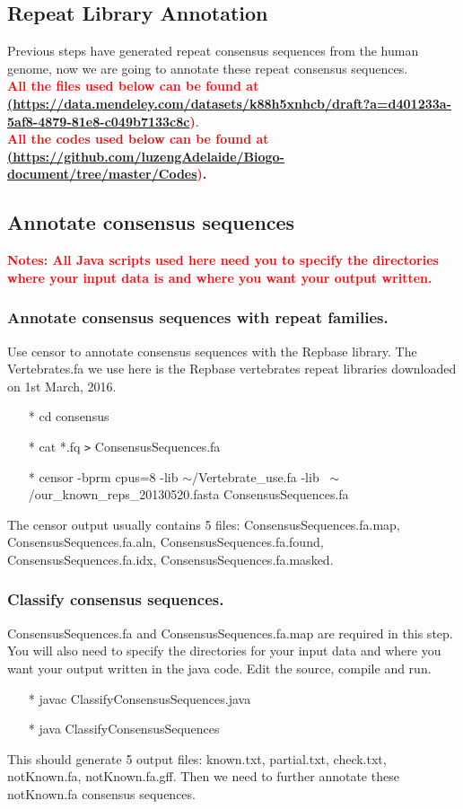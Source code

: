 \documentclass[12pt]{article}
\begin{document}
\subsection{Repeat Library Annotation}
Previous steps have generated repeat consensus sequences from the human genome, now we are going to annotate these repeat consensus sequences. \\
\textbf{\textcolor{red}{All the files used below can be found at \\
		\href{<url>}(\url{https://data.mendeley.com/datasets/k88h5xnhcb/draft?a=d401233a-5af8-4879-81e8-c049b7133c8c})}}. \\
\textbf{\textcolor{red}{All the codes used below can be found at \\ \href{<url>}(\url{https://github.com/luzengAdelaide/Biogo-document/tree/master/Codes})}.} 

\subsection{Annotate consensus sequences}
\textbf{\textcolor{red}{Notes: All Java scripts used here need you to specify the directories where your input data is and where you want your output written. }}

\subsubsection{Annotate consensus sequences with repeat families.}
Use censor to annotate consensus sequences with the Repbase library. The Vertebrates.fa we use here is the Repbase vertebrates repeat libraries downloaded on 1st March, 2016. 
\begin{enumerate}
	\item[*] cd consensus
	\item[*] cat *.fq \texttt{>} ConsensusSequences.fa 
	\item[*] censor -bprm cpus=8 -lib $\sim$/Vertebrate\_use.fa -lib ~$\sim$/our\_known\_reps\_20130520.fasta ConsensusSequences.fa 
\end{enumerate}
The censor output usually contains 5 files: ConsensusSequences.fa.map, ConsensusSequences.fa.aln, ConsensusSequences.fa.found, ConsensusSequences.fa.idx, ConsensusSequences.fa.masked. 

\subsubsection{Classify consensus sequences.}
ConsensusSequences.fa and ConsensusSequences.fa.map are required in this step. You will also need to specify the directories for your input data and where you want your output written in the java code. Edit the source, compile and run.\\
\begin{enumerate}
	\item[*] javac ClassifyConsensusSequences.java
	\item[*] java ClassifyConsensusSequences
\end{enumerate}
This should generate 5 output files: known.txt, partial.txt, check.txt, notKnown.fa, notKnown.fa.gff. 
Then we need to further annotate these notKnown.fa consensus sequences. 
\end{document}
